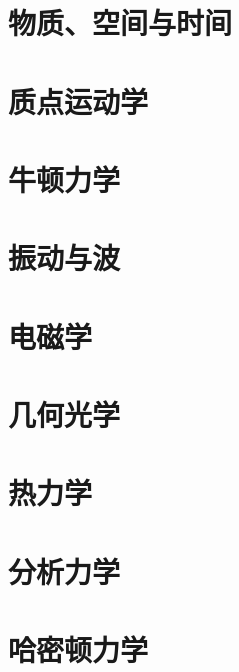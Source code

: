 \documentclass[UTF8, a4paper]{ctexart}
\begin{document}
{
\pagestyle{empty}
\tableofcontents
\newpage
\setcounter{page}{1}
}

\part{物质、空间与时间}



\part{质点运动学}


\part{牛顿力学}



\part{振动与波}




\part{电磁学}






\part{几何光学}


\part{热力学}





\part{分析力学}






\part{哈密顿力学}



\end{document}
